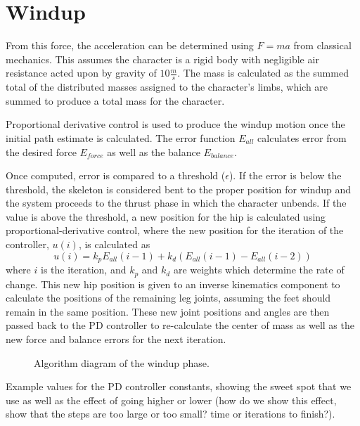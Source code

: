 \section{Windup}
From this force, the acceleration can be determined using $F=ma$ from classical mechanics.  This assumes the character is a rigid body with negligible air resistance acted upon by gravity of $10\frac{m}{s}$.  The mass is calculated as the summed total of the distributed masses assigned to the character's limbs, which are summed to produce a total mass for the character.

Proportional derivative control is used to produce the windup motion once the initial path estimate is calculated.  The error function $E_{all}$ calculates error from the desired force $E_{force}$ as well as the balance $E_{balance}$.

Once computed, error is compared to a threshold ($\epsilon$).  If the error is below the threshold, the skeleton is considered bent to the proper position for windup and the system proceeds to the thrust phase in which the character unbends.  If the value is above the threshold, a new position for the hip is calculated using proportional-derivative control, where the new position for the iteration of the controller, $u(i)$, is calculated as \[u(i) = k_p E_{all}(i - 1) + k_d(E_{all}(i-1) - E_{all}(i-2))\] where $i$ is the iteration, and $k_p$ and $k_d$ are weights which determine the rate of change. This new hip position is given to an inverse kinematics component to calculate the positions of the remaining leg joints, assuming the feet should remain in the same position.  These new joint positions and angles are then passed back to the PD controller to re-calculate the center of mass as well as the new force and balance errors for the next iteration.

\begin{figure}[ht]
	\centering
	\resizebox{\textwidth}{!}{
		
	}
	\caption[Diagram of windup phase algorithm]{Algorithm diagram of the windup phase.}
	\label{fig:bendPhase}
\end{figure}

\begin{table}[ht]
	\centering
	\caption[Table of PD controller constants for windup phase]{Example values for the PD controller constants, showing the sweet spot that we use as well as the effect of going higher or lower (how do we show this effect, show that the steps are too large or too small? time or iterations to finish?).}
	\label{tab:windup_pd_vals}
\end{table}

